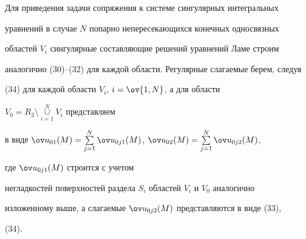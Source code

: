  


Для приведения задачи сопряжения к системе сингулярных интегральных  


уравнений в случае $N$ попарно непересекающихся конечных односвязных  


областей $V_i$ сингулярные составляющие решений уравнений Ламе строим  


аналогично (30)--(32) для каждой области. Регулярные слагаемые берем, следуя  


(34) для каждой области $V_i$, $i=\ov{1,N}$, а для области 


$V_0=R_3\setminus\mathop{\cup}\limits^N_{i=1}V_i$ представляем  


в виде $\ov u_{01}(M)=\sum\limits^N_{j=1}\ov u_{0j1}(M)$, $\ov 


u_{02}(M)=\sum\limits^N_{j=1}\ov u_{0j2}(M)$, 


где $\ov u_{0j1}(M)$ строится с учетом  


негладкостей поверхностей раздела $S_i$ областей $V_i$ и $V_0$ аналогично  


изложенному выше, а слагаемые $\ov u_{0j2}(M)$ представляются в виде (33), 


(34). 


 


 


